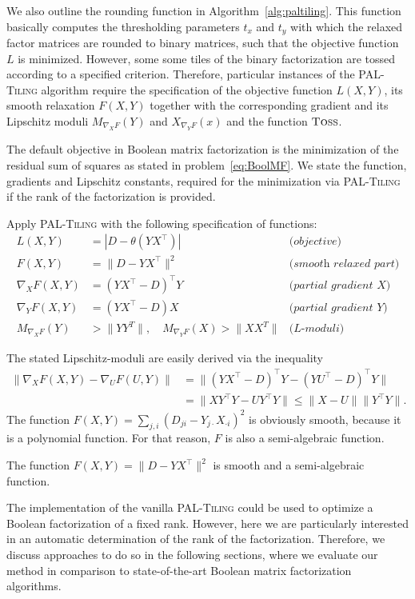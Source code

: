 We also outline the rounding function in Algorithm~\ref{alg:paltiling}. This function basically computes the thresholding parameters $t_x$ and $t_y$ with which the relaxed factor matrices are rounded to binary matrices, such that the objective function $L$ is minimized. However, some some tiles of the binary factorization are tossed according to a specified criterion. Therefore, particular instances of the \textsc{PAL-Tiling} algorithm require the specification of the objective function $L(X,Y)$, its smooth relaxation $F(X,Y)$ together with the corresponding gradient and its Lipschitz moduli $M_{\nabla_XF}(Y)$ and $X_{\nabla_YF}(x)$ and the function $\textsc{Toss}$.

The default objective in Boolean matrix factorization is the minimization of the residual sum of squares as stated in problem~\eqref{eq:BoolMF}. We state the function, gradients and Lipschitz constants, required for the minimization via \textsc{PAL-Tiling} if the rank of the factorization is provided.
\begin{algSpec}\label{algSpec:BMF}
Apply \textsc{PAL-Tiling} with the following specification of functions:
\begin{align*}
    L(X,Y) &= |D-\theta(YX^\top)| & \textit{(objective)}\\
    F(X,Y)&=\|D-YX^\top\|^2 &\textit{(smooth relaxed part)}\\
    \nabla_XF(X,Y) &= (YX^\top-D)^\top Y &\textit{(partial gradient $X$)}\\
    \nabla_YF(X,Y) &= (YX^\top-D) X &\textit{(partial gradient $Y$)}\\
    M_{\nabla_XF}(Y)&>\|YY^T\|, \quad M_{\nabla_YF}(X)>\|XX^T\| &\textit{(L-moduli)} 
\end{align*}
\end{algSpec}
The stated Lipschitz-moduli are easily derived via the inequality
\begin{align*}
    \|\nabla_XF(X,Y) - \nabla_UF(U,Y)\| &= \|(YX^\top-D)^\top Y - (YU^\top-D)^\top Y\|\\
    &= \|XY^\top Y - UY^\top Y\| \leq \|X-U\|\|Y^\top Y\|.
\end{align*}
The function $F(X,Y)=\sum_{j,i}(D_{ji}-Y_{ j\cdot}X_{\cdot i})^2$ is obviously smooth, because it is a polynomial function. For that reason, $F$ is also a semi-algebraic function.
\begin{corollary}
The function $F(X,Y)=\|D-YX^\top\|^2$ is smooth and a semi-algebraic function.
\end{corollary}
The implementation of the vanilla \textsc{PAL-Tiling} could be used to optimize a Boolean factorization of a fixed rank. However, here we are particularly interested in an automatic determination of the rank of the factorization. Therefore, we discuss approaches to do so in the following sections, where we evaluate our method in comparison to state-of-the-art Boolean matrix factorization algorithms. 
